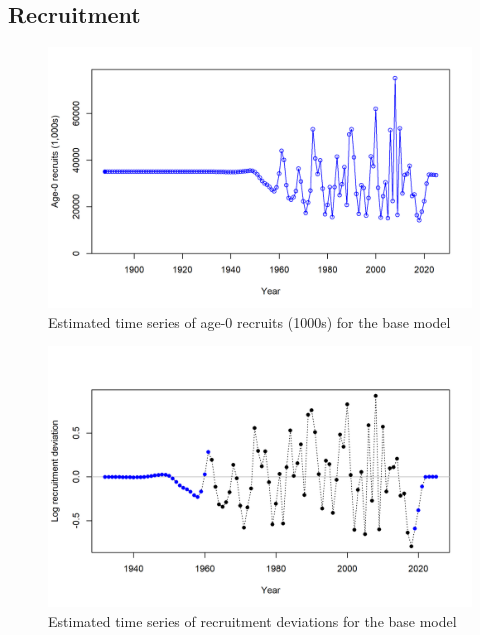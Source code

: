 \documentclass[
]{scrartcl}
\begin{document}
\clearpage

\hypertarget{recruitment}{%
\subsection*{Recruitment}\label{recruitment}}



\begin{figure}

{\centering \includegraphics[width=6in,height=\textheight]{r4ss_plots/ts11_Age-0_recruits_(1000s).png}

}

\caption{\label{fig-es-frac-unfished}Estimated time series of age-0
recruits (1000s) for the base model}

\end{figure}

\begin{figure}

{\centering \includegraphics[width=6in,height=\textheight]{r4ss_plots/recdevs1_points.png}

}

\caption{\label{fig-es-rec-devs}Estimated time series of recruitment
deviations for the base model}

\end{figure}
\end{document}
